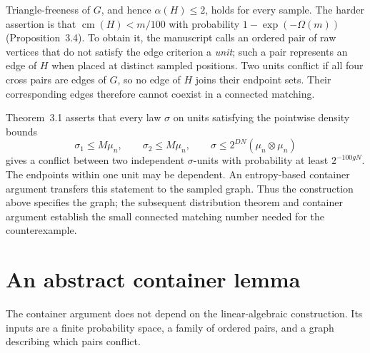 \documentclass[11pt]{article}
\newcommand{\cm}{\operatorname{cm}}
\begin{document}
Triangle-freeness of $G$, and hence $\alpha(H)\le2$, holds for every sample. The harder assertion is that $\cm(H)<m/100$ with probability $1-\exp(-\Omega(m))$ (Proposition~3.4). To obtain it, the manuscript calls an ordered pair of raw vertices that do not satisfy the edge criterion a \emph{unit}; such a pair represents an edge of $H$ when placed at distinct sampled positions. Two units conflict if all four cross pairs are edges of $G$, so no edge of $H$ joins their endpoint sets. Their corresponding edges therefore cannot coexist in a connected matching.

Theorem~3.1 asserts that every law $\sigma$ on units satisfying the pointwise density bounds
\[
\sigma_1\le M\mu_n,\qquad \sigma_2\le M\mu_n,\qquad
\sigma\le2^{DN}(\mu_n\otimes\mu_n)
\]
gives a conflict between two independent $\sigma$-units with probability at least $2^{-100gN}$. The endpoints within one unit may be dependent. An entropy-based container argument transfers this statement to the sampled graph. Thus the construction above specifies the graph; the subsequent distribution theorem and container argument establish the small connected matching number needed for the counterexample.
\section{An abstract container lemma}
\label{sec:abstract-containers}
The container argument does not depend on the linear-algebraic construction. Its inputs are a finite probability space, a family of ordered pairs, and a graph describing which pairs conflict.
\end{document}
